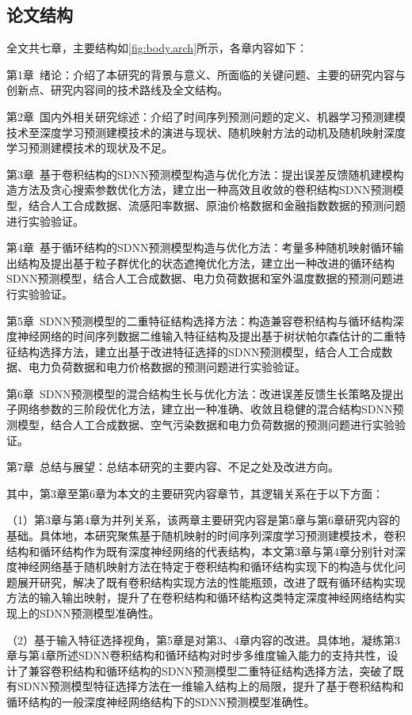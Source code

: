 \subsection{论文结构}
全文共七章，主要结构如\cref{fig:body.arch}所示，各章内容如下：

第1章~绪论：介绍了本研究的背景与意义、所面临的关键问题、主要的研究内容与创新点、研究内容间的技术路线及全文结构。

第2章~国内外相关研究综述：介绍了时间序列预测问题的定义、机器学习预测建模技术至深度学习预测建模技术的演进与现状、随机映射方法的动机及随机映射深度学习预测建模技术的现状及不足。

第3章~基于卷积结构的SDNN预测模型构造与优化方法：提出误差反馈随机建模构造方法及贪心搜索参数优化方法，建立出一种高效且收敛的卷积结构SDNN预测模型，结合人工合成数据、流感阳率数据、原油价格数据和金融指数数据的预测问题进行实验验证。

第4章~基于循环结构的SDNN预测模型构造与优化方法：考量多种随机映射循环输出结构及提出基于粒子群优化的状态遮掩优化方法，建立出一种改进的循环结构SDNN预测模型，结合人工合成数据、电力负荷数据和室外温度数据的预测问题进行实验验证。

第5章~SDNN预测模型的二重特征结构选择方法：构造兼容卷积结构与循环结构深度神经网络的时间序列数据二维输入特征结构及提出基于树状帕尔森估计的二重特征结构选择方法，建立出基于改进特征选择的SDNN预测模型，结合人工合成数据、电力负荷数据和电力价格数据的预测问题进行实验验证。

第6章~SDNN预测模型的混合结构生长与优化方法：改进误差反馈生长策略及提出子网络参数的三阶段优化方法，建立出一种准确、收敛且稳健的混合结构SDNN预测模型，结合人工合成数据、空气污染数据和电力负荷数据的预测问题进行实验验证。

第7章~总结与展望：总结本研究的主要内容、不足之处及改进方向。

其中，第3章至第6章为本文的主要研究内容章节，其逻辑关系在于以下方面：

（1）第3章与第4章为并列关系，该两章主要研究内容是第5章与第6章研究内容的基础。具体地，本研究聚焦基于随机映射的时间序列深度学习预测建模技术，卷积结构和循环结构作为既有深度神经网络的代表结构，本文第3章与第4章分别针对深度神经网络基于随机映射方法在特定于卷积结构和循环结构实现下的构造与优化问题展开研究，解决了既有卷积结构实现方法的性能瓶颈，改进了既有循环结构实现方法的输入输出映射，提升了在卷积结构和循环结构这类特定深度神经网络结构实现上的SDNN预测模型准确性。

（2）基于输入特征选择视角，第5章是对第3、4章内容的改进。具体地，凝练第3章与第4章所述SDNN卷积结构和循环结构对时步多维度输入能力的支持共性，设计了兼容卷积结构和循环结构的SDNN预测模型二重特征结构选择方法，突破了既有SDNN预测模型特征选择方法在一维输入结构上的局限，提升了基于卷积结构和循环结构的一般深度神经网络结构下的SDNN预测模型准确性。

